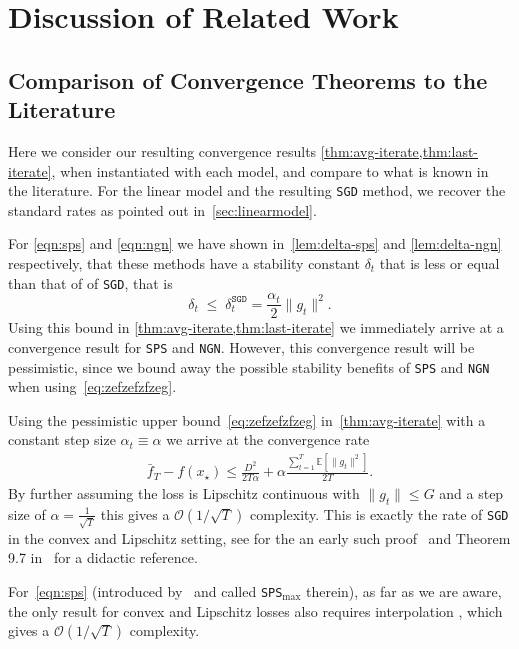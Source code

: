 \documentclass{article}
\newcommand{\E}{\mathbb{E}}
\newcommand{\SGD}{{\texttt{SGD}}}
\newcommand{\SPS}{{\texttt{SPS}}}
\newcommand{\NGN}{{\texttt{NGN}}}
\theoremstyle{plain}
\theoremstyle{definition}
\theoremstyle{remark}
\begin{document}
\section{Discussion of Related Work}

\subsection{Comparison of Convergence Theorems to the Literature} \label{sec:app:conv-comparison}

Here we consider our resulting convergence results \cref{thm:avg-iterate,thm:last-iterate}, when instantiated with each model, and compare to what is known in the literature. For the linear model and the resulting \SGD{} method, we recover the standard rates as pointed out in~\cref{sec:linearmodel}.

For \eqref{eqn:sps} and \eqref{eqn:ngn} we have shown in~\cref{lem:delta-sps} and \cref{lem:delta-ngn} respectively, that these methods have a stability constant $\delta_t$ that is less or equal than that of of \SGD{}, that is 
\begin{equation} \label{eq:zefzefzfzeg}
    \delta_t \;\leq \; \delta_t^{\SGD{}} =  \frac{\alpha_t}{2}\|g_t\|^2.
\end{equation}  Using this bound in \cref{thm:avg-iterate,thm:last-iterate} we immediately arrive at a convergence result for \SPS{} and \NGN{}. However, this convergence result will be pessimistic, since we bound away the possible stability benefits of \SPS{} and \NGN{} when using~\eqref{eq:zefzefzfzeg}. 

Using the pessimistic upper bound~\eqref{eq:zefzefzfzeg}
in~\cref{thm:avg-iterate} with a constant step size $\alpha_t \equiv \alpha$ we arrive at the convergence rate
    \begin{align} \label{eq:theospspess}
        \bar f_T - f(x_\star) \leq \frac{D^2}{2T \alpha } + \alpha \frac{\sum_{t=1}^T  \E[\|g_t\|^2]}{2T}.
    \end{align}
    By further assuming the loss is Lipschitz continuous with $\|g_t\| \leq G$ and a step size of $\alpha = \frac{1}{\sqrt{T}}$ this gives a $\mathcal{O}(1/\sqrt{T})$ complexity.
This is exactly the rate of \SGD{} in the convex and Lipschitz setting, 
see for the an early such proof~\citet{pmlr-v28-shamir13} and Theorem 9.7 in~\citet{handbook} for a didactic reference.

For~\ref{eqn:sps} (introduced by~\citet{Loizou2021} and called \SPS{$_{\max}$} therein), as far as we are aware, the only result for convex and Lipschitz losses also requires interpolation \citep[Thm.\ C.1]{Loizou2021}, which gives a $\mathcal{O}(1/\sqrt{T})$ complexity.
\end{document}
